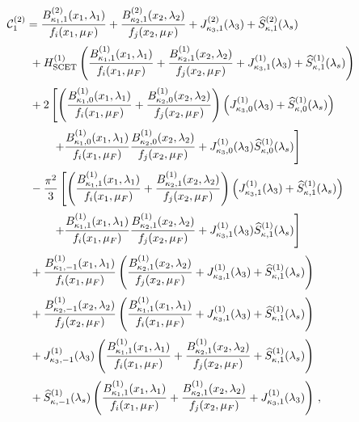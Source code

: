 \begin{equation}
\label{eq:C21}
\begin{aligned}
&\mathcal{C}^{(2)}_1=\frac{B_{\kappa_1,1}^{(2)}(x_1,\lambda_1)}{f_i(x_1,\mu_F)}+\frac{B_{\kappa_2,1}^{(2)}(x_2,\lambda_2)}{f_j(x_2,\mu_F)}+
    J_{\kappa_3,1}^{(2)}(\lambda_3)
    +\widehat{S}^{(2)}_{\kappa,1}(\lambda_s)\\[0.5ex]
    &\qquad + H^{(1)}_{\rm SCET}\left(\frac{B_{\kappa_1,1}^{(1)}(x_1,\lambda_1)}{f_i(x_1,\mu_F)}+\frac{B_{\kappa_2,1}^{(1)}(x_2,\lambda_2)}{f_j(x_2,\mu_F)}+
    J_{\kappa_3,1}^{(1)}(\lambda_3)
    +\widehat{S}^{(1)}_{\kappa,1}(\lambda_s)\right)\\[0.5ex]
    &\qquad +2\left[\left(\frac{B^{(1)}_{\kappa_1,0}(x_1,\lambda_1)}{f_i(x_1,\mu_F)}+\frac{B^{(1)}_{\kappa_2,0}(x_2,\lambda_2)}{f_j(x_2,\mu_F)}\right)\left(J_{\kappa_3,0}^{(1)}(\lambda_3)+\widehat{S}^{(1)}_{\kappa,0}(\lambda_s)\right)\right.\\[0.5ex]
    &\qquad\qquad\left.+\frac{B^{(1)}_{\kappa_1,0}(x_1,\lambda_1)}{f_i(x_1,\mu_F)}\frac{B^{(1)}_{\kappa_2,0}(x_2,\lambda_2)}{f_j(x_2,\mu_F)}+J_{\kappa_3,0}^{(1)}(\lambda_3)\widehat{S}^{(1)}_{\kappa,0}(\lambda_s)\right]\\[0.5ex]
    &\qquad -\frac{\pi^2}{3}\left[\left(\frac{B^{(1)}_{\kappa_1,1}(x_1,\lambda_1)}{f_i(x_1,\mu_F)}+\frac{B^{(1)}_{\kappa_2,1}(x_2,\lambda_2)}{f_j(x_2,\mu_F)}\right)\left(J_{\kappa_3,1}^{(1)}(\lambda_3)+\widehat{S}^{(1)}_{\kappa,1}(\lambda_s)\right)\right.\\[0.5ex]
    &\qquad\qquad\left.+\frac{B^{(1)}_{\kappa_1,1}(x_1,\lambda_1)}{f_i(x_1,\mu_F)}\frac{B^{(1)}_{\kappa_2,1}(x_2,\lambda_2)}{f_j(x_2,\mu_F)}+J_{\kappa_3,1}^{(1)}(\lambda_3)\widehat{S}^{(1)}_{\kappa,1}(\lambda_s)\right]\\[0.5ex]
    &\qquad +\frac{B_{\kappa_1,-1}^{(1)}(x_1,\lambda_1)}{f_i(x_1,\mu_F)}\left(\frac{B_{\kappa_2,1}^{(1)}(x_2,\lambda_2)}{f_j(x_2,\mu_F)}+J_{\kappa_3,1}^{(1)}(\lambda_3)
    +\widehat{S}^{(1)}_{\kappa,1}(\lambda_s)\right)\\[0.5ex]
    &\qquad +\frac{B_{\kappa_2,-1}^{(1)}(x_2,\lambda_2)}{f_j(x_2,\mu_F)}\left(\frac{B_{\kappa_1,1}^{(1)}(x_1,\lambda_1)}{f_i(x_1,\mu_F)}+J_{\kappa_3,1}^{(1)}(\lambda_3)
    +\widehat{S}^{(1)}_{\kappa,1}(\lambda_s)\right)\\[0.5ex]
    &\qquad +J_{\kappa_3,-1}^{(1)}(\lambda_3)\left(\frac{B_{\kappa_1,1}^{(1)}(x_1,\lambda_1)}{f_i(x_1,\mu_F)}+\frac{B_{\kappa_2,1}^{(1)}(x_2,\lambda_2)}{f_j(x_2,\mu_F)}+\widehat{S}^{(1)}_{\kappa,1}(\lambda_s)\right)\\[0.5ex]
    &\qquad +\widehat{S}^{(1)}_{\kappa,-1}(\lambda_s)\left(\frac{B_{\kappa_1,1}^{(1)}(x_1,\lambda_1)}{f_i(x_1,\mu_F)}+\frac{B_{\kappa_2,1}^{(1)}(x_2,\lambda_2)}{f_j(x_2,\mu_F)}+J_{\kappa_3,1}^{(1)}(\lambda_3)\right)\,,
\end{aligned}
\end{equation}
